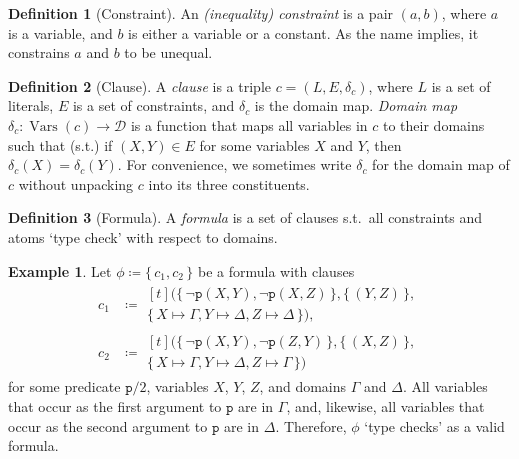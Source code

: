 \documentclass{article}
\theoremstyle{definition}
\newtheorem{definition}{Definition}
\newtheorem{example}{Example}
\theoremstyle{remark}
\DeclareMathOperator{\Vars}{Vars}
\begin{document}
\begin{definition}[Constraint]\label{def:constraint}
  An \emph{(inequality) constraint} is a pair $(a, b)$, where $a$ is a variable,
  and $b$ is either a variable or a constant. As the name implies, it constrains
  $a$ and $b$ to be unequal.
\end{definition}

\begin{definition}[Clause]\label{def:clause}
  A \emph{clause} is a triple $c = (L, E, \delta_c)$, where $L$ is a set of
  literals, $E$ is a set of constraints, and $\delta_c$ is the domain map.
  \emph{Domain map} $\delta_{c}\colon \Vars(c) \to \mathcal{D}$ is a function
  that maps all variables in $c$ to their domains such that (s.t.) if
  $(X, Y) \in E$ for some variables $X$ and $Y$, then
  $\delta_c(X) = \delta_c(Y)$. For convenience, we sometimes write $\delta_c$
  for the domain map of $c$ without unpacking $c$ into its three constituents.
\end{definition}

\begin{definition}[Formula]\label{def:formula}
  A \emph{formula} is a set of clauses s.t.\ all constraints and atoms `type
  check' with respect to domains.
\end{definition}

\begin{example}\label{example:first}
  Let $\phi \coloneqq \{\, c_1, c_2 \,\}$ be a formula with clauses
  \begin{align*}
    c_1 &\coloneqq
          \begin{multlined}[t]
            (\{\, \neg \texttt{p}(X, Y), \neg \texttt{p}(X, Z) \,\}, \{\, (Y, Z) \,\}, \\
            \{\, X \mapsto \Gamma, Y \mapsto \Delta, Z \mapsto \Delta \,\}),
          \end{multlined}\\
    c_2 &\coloneqq
          \begin{multlined}[t]
            (\{\, \neg \texttt{p}(X, Y), \neg \texttt{p}(Z, Y) \,\}, \{\, (X, Z) \,\}, \\
            \{\, X \mapsto \Gamma, Y \mapsto \Delta, Z \mapsto \Gamma \,\})
          \end{multlined}
  \end{align*}
  for some predicate $\texttt{p}/2$, variables $X$, $Y$, $Z$, and domains
  $\Gamma$ and $\Delta$. All variables that occur as the first argument to
  $\texttt{p}$ are in $\Gamma$, and, likewise, all variables that occur as the
  second argument to $\texttt{p}$ are in $\Delta$. Therefore, $\phi$ `type
  checks' as a valid formula.
\end{example}
\end{document}
